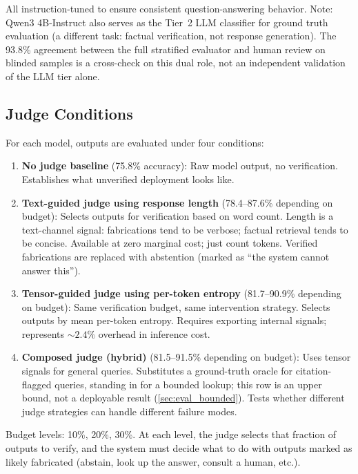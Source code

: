 \documentclass[11pt]{article}
\begin{document}
All instruction-tuned to ensure consistent question-answering behavior. Note: Qwen3 4B-Instruct also serves as the Tier~2 LLM classifier for ground truth evaluation (a different task: factual verification, not response generation). The 93.8\% agreement between the full stratified evaluator and human review on blinded samples is a cross-check on this dual role, not an independent validation of the LLM tier alone.

\subsection{Judge Conditions}

For each model, outputs are evaluated under four conditions:

\begin{enumerate}
    \item \textbf{No judge baseline} (75.8\% accuracy):
    Raw model output, no verification. Establishes what unverified deployment looks like.

    \item \textbf{Text-guided judge using response length} (78.4--87.6\% depending on budget):
    Selects outputs for verification based on word count.
    Length is a text-channel signal: fabrications tend to be verbose; factual retrieval tends to be concise.
    Available at zero marginal cost; just count tokens.
    Verified fabrications are replaced with abstention (marked as ``the system cannot answer this'').

    \item \textbf{Tensor-guided judge using per-token entropy} (81.7--90.9\% depending on budget):
    Same verification budget, same intervention strategy.
    Selects outputs by mean per-token entropy.
    Requires exporting internal signals; represents ${\sim}2.4\%$ overhead in inference cost.

    \item \textbf{Composed judge (hybrid)} (81.5--91.5\% depending on budget):
    Uses tensor signals for general queries.
    Substitutes a ground-truth oracle for citation-flagged queries, standing in for a bounded lookup; this row is an upper bound, not a deployable result (\autoref{sec:eval_bounded}).
    Tests whether different judge strategies can handle different failure modes.
\end{enumerate}

Budget levels: 10\%, 20\%, 30\%. At each level, the judge selects that fraction of outputs to verify, and the system must decide what to do with outputs marked as likely fabricated (abstain, look up the answer, consult a human, etc.).
\end{document}

